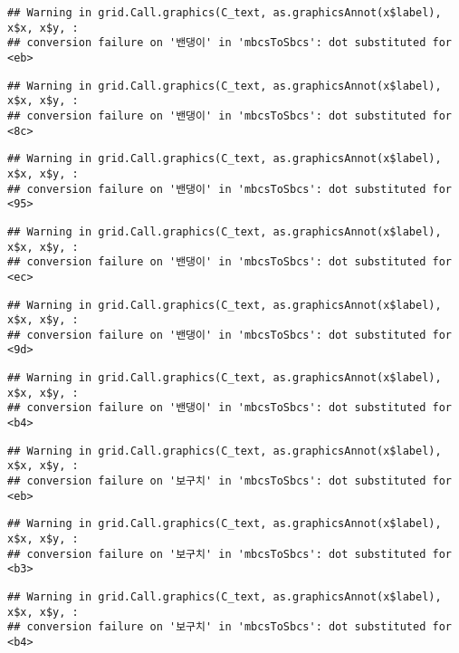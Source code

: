 \documentclass[
]{article}
\begin{document}
\begin{verbatim}
## Warning in grid.Call.graphics(C_text, as.graphicsAnnot(x$label), x$x, x$y, :
## conversion failure on '밴댕이' in 'mbcsToSbcs': dot substituted for <eb>
\end{verbatim}

\begin{verbatim}
## Warning in grid.Call.graphics(C_text, as.graphicsAnnot(x$label), x$x, x$y, :
## conversion failure on '밴댕이' in 'mbcsToSbcs': dot substituted for <8c>
\end{verbatim}

\begin{verbatim}
## Warning in grid.Call.graphics(C_text, as.graphicsAnnot(x$label), x$x, x$y, :
## conversion failure on '밴댕이' in 'mbcsToSbcs': dot substituted for <95>
\end{verbatim}

\begin{verbatim}
## Warning in grid.Call.graphics(C_text, as.graphicsAnnot(x$label), x$x, x$y, :
## conversion failure on '밴댕이' in 'mbcsToSbcs': dot substituted for <ec>
\end{verbatim}

\begin{verbatim}
## Warning in grid.Call.graphics(C_text, as.graphicsAnnot(x$label), x$x, x$y, :
## conversion failure on '밴댕이' in 'mbcsToSbcs': dot substituted for <9d>
\end{verbatim}

\begin{verbatim}
## Warning in grid.Call.graphics(C_text, as.graphicsAnnot(x$label), x$x, x$y, :
## conversion failure on '밴댕이' in 'mbcsToSbcs': dot substituted for <b4>
\end{verbatim}

\begin{verbatim}
## Warning in grid.Call.graphics(C_text, as.graphicsAnnot(x$label), x$x, x$y, :
## conversion failure on '보구치' in 'mbcsToSbcs': dot substituted for <eb>
\end{verbatim}

\begin{verbatim}
## Warning in grid.Call.graphics(C_text, as.graphicsAnnot(x$label), x$x, x$y, :
## conversion failure on '보구치' in 'mbcsToSbcs': dot substituted for <b3>
\end{verbatim}

\begin{verbatim}
## Warning in grid.Call.graphics(C_text, as.graphicsAnnot(x$label), x$x, x$y, :
## conversion failure on '보구치' in 'mbcsToSbcs': dot substituted for <b4>
\end{verbatim}
\end{document}
